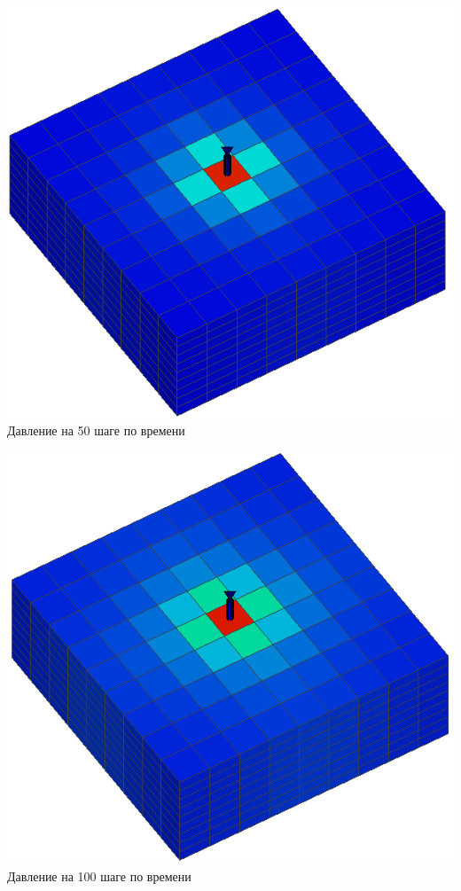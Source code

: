 \documentclass[12pt,a4paper]{article}
\begin{document}
{{\begin{minipage}[h]{0.4\linewidth}
\end{minipage}
\vfill
\begin{minipage}[h]{0.4\linewidth}
{\center\includegraphics[width=1\linewidth]{pics/pressure999_50.png}} Давление на 50 шаге по времени \\
\end{minipage}
\hfill
\begin{minipage}[h]{0.4\linewidth}
{\center\includegraphics[width=1\linewidth]{pics/pressure999_100.png}} Давление на 100 шаге по времени \\
\end{minipage}
}
\newpage
}
\end{document}
